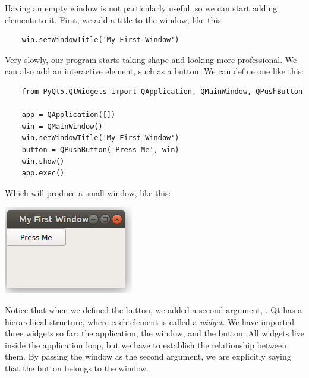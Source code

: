 
Having an empty window is not particularly useful, so we can start adding elements to it. First, we add a title to the window, like this:

\begin{verbatim}
    win.setWindowTitle('My First Window')
\end{verbatim}

Very slowly, our program starts taking shape and looking more professional. We can also add an interactive element, such as a button. We can define one like this:

\begin{verbatim}
    from PyQt5.QtWidgets import QApplication, QMainWindow, QPushButton

    app = QApplication([])
    win = QMainWindow()
    win.setWindowTitle('My First Window')
    button = QPushButton('Press Me', win)
    win.show()
    app.exec()
\end{verbatim}

Which will produce a small window, like this:

\begin{center}
    \includegraphics[width=.3\textwidth]{images/Chapter_08/02_simple_window_and_button.png}
\end{center}

Notice that when we defined the button, we added a second argument, . Qt has a hierarchical structure, where each element is called a \emph{widget}. We have imported three widgets so far: the application, the window, and the button. All widgets live inside the application loop, but we have to establish the relationship between them. By passing the window as the second argument, we are explicitly saying that the button belongs to the window.


